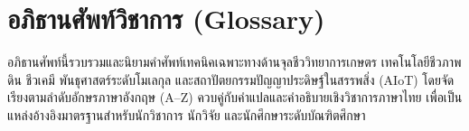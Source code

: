 
\chapter{อภิธานศัพท์วิชาการ (Glossary)}
\label{ch:glossary}

อภิธานศัพท์นี้รวบรวมและนิยามคำศัพท์เทคนิคเฉพาะทางด้านจุลชีววิทยาการเกษตร เทคโนโลยีชีวภาพดิน ชีวเคมี พันธุศาสตร์ระดับโมเลกุล และสถาปัตยกรรมปัญญาประดิษฐ์ในสรรพสิ่ง (AIoT) โดยจัดเรียงตามลำดับอักษรภาษาอังกฤษ (A--Z) ควบคู่กับคำแปลและคำอธิบายเชิงวิชาการภาษาไทย เพื่อเป็นแหล่งอ้างอิงมาตรฐานสำหรับนักวิชาการ นักวิจัย และนักศึกษาระดับบัณฑิตศึกษา

